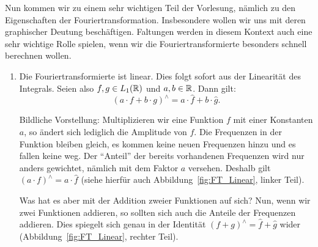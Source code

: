 Nun kommen wir zu einem sehr wichtigen Teil der Vorlesung, nämlich zu den Eigenschaften der
Fouriertransformation. Insbesondere wollen wir uns mit deren graphischer Deutung beschäftigen.
Faltungen werden in diesem Kontext auch eine sehr wichtige Rolle spielen, wenn wir die
Fouriertransformierte besonders schnell berechnen wollen.

\begin{remark} \leavevmode
	\begin{enumerate}
  	\item Die Fouriertransformierte ist linear. Dies folgt sofort aus der Linearität des Integrals.
  	Seien also $ f, g \in L_{1}(\mathbb{R}) $ und $ a, b \in \mathbb{R} $. Dann gilt:
    	\[
      	(a \cdot f + b \cdot g)^{\wedge} = a \cdot \widehat{f} + b \cdot \widehat{g}.
    	\]
    
    Bildliche Vorstellung: Multiplizieren wir eine Funktion $ f $ mit einer Konstanten $ a $, so
    ändert sich lediglich die Amplitude von $ f $. Die Frequenzen in der Funktion bleiben gleich,
    es kommen keine neuen Frequenzen hinzu und es fallen keine weg. Der \enquote{Anteil} der bereits
    vorhandenen Frequenzen wird nur anders gewichtet, nämlich mit dem Faktor $ a $ versehen. 
    Deshalb gilt $ (a \cdot f)^{\wedge} = a \cdot \widehat{f} $ (siehe hierfür auch 
    Abbildung~\ref{fig:FT_Linear}, linker Teil).
    
    Was hat es aber mit der Addition zweier Funktionen auf sich? Nun, wenn wir zwei Funktionen 
    addieren, so sollten sich auch die Anteile der Frequenzen addieren. Dies spiegelt sich genau in 
    der Identität $ (f + g)^{\wedge} = \widehat{f} + \widehat{g} $ wider 
    (Abbildung~\ref{fig:FT_Linear}, rechter Teil).
    

\end{enumerate}
\end{remark}
